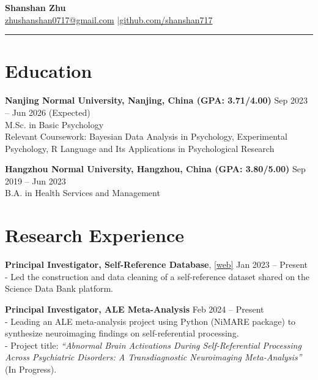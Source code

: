 \documentclass[11pt,a4paper]{article}
\begin{document}
\begin{center}
    {\LARGE \textbf{Shanshan Zhu}} \\
    \vspace{0.2cm}
    \href{mailto:zhushanshan0717@gmail.com}{zhushanshan0717@gmail.com} \quad |\quad \href{https://github.com/shanshan717}{github.com/shanshan717} \\
\end{center}

\hrule
\vspace{0.5cm}

\section*{Education}

\textbf{Nanjing Normal University, Nanjing, China (GPA: 3.71/4.00)} \hfill Sep 2023 -- Jun 2026 (Expected) \\
M.Sc. in Basic Psychology \\
Relevant Coursework: Bayesian Data Analysis in Psychology, Experimental Psychology, R Language and Its Applications in Psychological Research

\vspace{0.3cm}

\textbf{Hangzhou Normal University, Hangzhou, China (GPA: 3.80/5.00)} \hfill Sep 2019 -- Jun 2023 \\
B.A. in Health Services and Management

\vspace{0.5cm}

\section*{Research Experience}

\textbf{Principal Investigator, Self-Reference Database}, \href{https://doi.org/10.57760/sciencedb.j00001.00469}{[web]}  \hfill Jan 2023 -- Present \\
- Led the construction and data cleaning of a self-reference dataset shared on the Science Data Bank platform.

\textbf{Principal Investigator, ALE Meta-Analysis} \hfill Feb 2024 -- Present \\
- Leading an ALE meta-analysis project using Python (NiMARE package) to synthesize neuroimaging findings on self-referential processing. \\
- Project title: \textit{``Abnormal Brain Activations During Self-Referential Processing Across Psychiatric Disorders: A Transdiagnostic Neuroimaging Meta-Analysis''} (In Progress).
\end{document}
